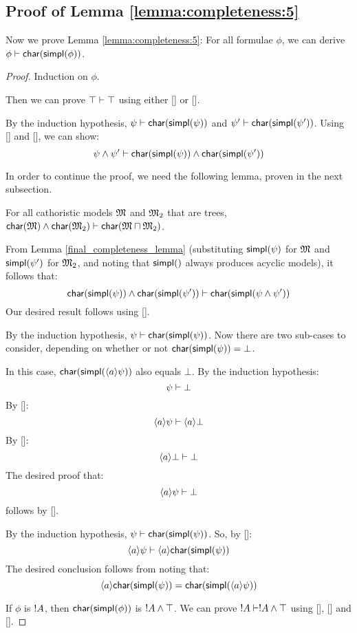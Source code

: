 \subsection{Proof of Lemma \ref{lemma:completeness:5}}
\label{prooflemma5}

Now we prove Lemma \ref{lemma:completeness:5}: 
For all formulae $\phi$, we can derive $\phi \vdash \mathsf{char}(\mathsf{simpl}(\phi))$.

\begin{proof}
Induction on $\phi$.


 Then we can prove $\top \vdash \top$ using
either [] or [].

 By the induction hypothesis,
$\psi \vdash \mathsf{char}(\mathsf{simpl}(\psi))$ and $\psi' \vdash
\mathsf{char}(\mathsf{simpl}(\psi'))$.  Using [] and [], we can show:
\[
\psi \land \psi' \vdash  \mathsf{char}(\mathsf{simpl}(\psi)) \land  \mathsf{char}(\mathsf{simpl}(\psi'))
\]


In order to continue the proof, we need the following lemma, proven
in the next subsection.

\begin{lemma}
\label{final_completeness_lemma}
For all cathoristic  models $\frak{M}$ and $\frak{M}_2$ that are trees, $ \mathsf{char}(\frak{M}) \land
\mathsf{char}(\frak{M}_2) \vdash \mathsf{char}(\frak{M} \sqcap \frak{M}_2)$.
\end{lemma}

\NI From Lemma \ref{final_completeness_lemma} (substituting $\mathsf{simpl}(\psi)$ for $\frak{M}$ and $\mathsf{simpl}(\psi')$ for $\frak{M}_2$, and noting that $\mathsf{simpl}()$ always produces acyclic models), it follows that:
\[
 \mathsf{char}(\mathsf{simpl}(\psi)) \land  \mathsf{char}(\mathsf{simpl}(\psi')) \vdash  \mathsf{char}(\mathsf{simpl}(\psi \land \psi'))
\]
Our desired result follows using [].

 By the induction
hypothesis, $\psi \vdash \mathsf{char}(\mathsf{simpl}(\psi))$.  Now there are two
sub-cases to consider, depending on whether or not $
\CHAR{\SIMPL{\psi}} = \bot$.  

\SUBCASE{$ \CHAR{\SIMPL{\psi}} = \bot$} In this case, $
\mathsf{char}(\mathsf{simpl}(\langle a \rangle \psi))$ also equals $\bot$.  By the
induction hypothesis:
\[
\psi \vdash \bot
\]
By []:
\[
\langle a \rangle \psi \vdash \langle a \rangle \bot
\]
By []:
\[
\langle a \rangle \bot \vdash \bot
\]
The desired proof that:
\[
\langle a \rangle \psi \vdash \bot
\]
follows by [].

\SUBCASE{$ \CHAR{\SIMPL{\psi}} \neq \bot$}
By the induction hypothesis, $\psi \vdash  \mathsf{char}(\mathsf{simpl}(\psi))$.
So, by []:
\[
\langle a \rangle \psi \vdash \langle a \rangle  \mathsf{char}(\mathsf{simpl}(\psi))
\]
The desired conclusion follows from noting that:
\[
 \langle a \rangle  \mathsf{char}(\mathsf{simpl}(\psi)) =  \mathsf{char}(\mathsf{simpl}(\langle a \rangle \psi))
 \]

  If $\phi$ is $! A$, then $
 \mathsf{char}(\mathsf{simpl}(\phi))$ is $! A \land \top$.  We can prove $! A
 \vdash ! A \land \top$ using [], [] and [].
\end{proof}

